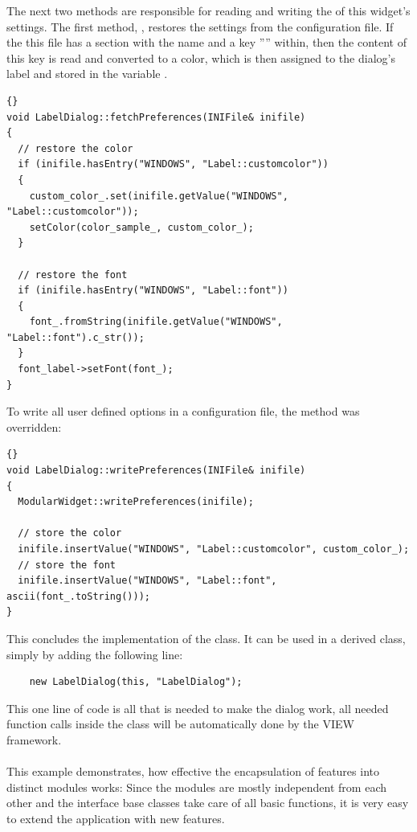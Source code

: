The next two methods are responsible for reading and writing the of this widget's settings.
The first method, , restores the settings from the configuration file.
If the this file has a section with the name  and a key 
'''' within, then the content of this key is read and converted 
to a color, which is then assigned to the dialog's label and stored in the variable
.
\begin{lstlisting}{}
void LabelDialog::fetchPreferences(INIFile& inifile)
{
  // restore the color 
  if (inifile.hasEntry("WINDOWS", "Label::customcolor"))
  {
    custom_color_.set(inifile.getValue("WINDOWS", "Label::customcolor"));
    setColor(color_sample_, custom_color_);
  }

  // restore the font
  if (inifile.hasEntry("WINDOWS", "Label::font"))
  {
    font_.fromString(inifile.getValue("WINDOWS", "Label::font").c_str());
  }
  font_label->setFont(font_);
}
\end{lstlisting}

\vspace{0.3cm}
To write all user defined options in a configuration file, the method
 was overridden:
\begin{lstlisting}{}
void LabelDialog::writePreferences(INIFile& inifile)
{
  ModularWidget::writePreferences(inifile);

  // store the color
  inifile.insertValue("WINDOWS", "Label::customcolor", custom_color_);
  // store the font
  inifile.insertValue("WINDOWS", "Label::font", ascii(font_.toString()));
}
\end{lstlisting}

This concludes the implementation of the  class. 
It can be used in a derived  class, simply by adding the following line: 
\begin{verbatim}
	new LabelDialog(this, "LabelDialog");
\end{verbatim}
This one line of code is all that is needed to make the dialog work, all needed function 
calls inside the  class will be automatically done by the VIEW framework.
\\
\\
This example demonstrates, how effective the encapsulation of features into distinct
modules works: Since the modules are mostly independent from each other and the interface
base classes take care of all basic functions, it is very easy to extend the application
with new features.

